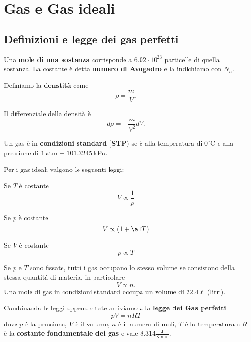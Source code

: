 \chapter{Gas e Gas ideali}

\section{Definizioni e legge dei gas perfetti}
\begin{definition}[Mole]
Una \textbf{mole di una sostanza} corrisponde a $6.02\cdot 10^{23}$ particelle di quella sostanza. La costante \`e detta \textbf{numero di Avogadro} e la indichiamo con $N_a$. 
\end{definition}

\begin{definition}[Densit\`a]
Definiamo la \textbf{denstit\`a} come
\[\rho=\frac mV.\]
\end{definition}
\begin{remark}
Il differenziale della densit\`a \`e
\[d\rho=-\frac m{V^2}dV.\]
\end{remark}

\begin{definition}
Un gas \`e in \textbf{condizioni standard} (\textbf{STP}) se \`e alla temperatura di $0^\circ\mathrm C$ e alla pressione di $1\ \mathrm{atm}=101.3245\ \mathrm{kPa}$.
\end{definition}

\noindent Per i gas ideali valgono le seguenti leggi:
\begin{fact}
Se $T$ \`e costante
\[V\propto \frac1p\]
\end{fact}
\begin{fact}
Se $p$ \`e costante
\[V\propto (1+\al T)\]
\end{fact}
\begin{fact}
Se $V$ \`e costante
\[p\propto T\]
\end{fact}
\begin{fact}
Se $p$ e $T$ sono fissate, tutti i gas occupano lo stesso volume se consistono della stessa quantit\`a di materia, in particolare
\[V\propto n.\]
Una mole di gas in condizioni standard occupa un volume di $22.4\ell$ (litri).
\end{fact}

\noindent Combinando le leggi appena citate arriviamo alla \textbf{legge dei Gas perfetti}
\[\boxed{pV=nRT}\]
dove $p$ \`e la pressione, $V$ \`e il volume, $n$ \`e il numero di moli, $T$ \`e la temperatura e $R$ \`e la \textbf{costante fondamentale dei gas} e vale $8.314 \frac{\mathrm{J}}{\mathrm{K}\ \mathrm{mol}}$.

